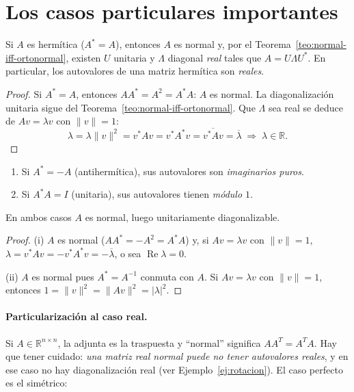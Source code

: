 \section{Los casos particulares importantes}\label{sec:casos-particulares}

\begin{corollary}\label{cor:hermitico}
Si \(A\) es hermítica (\(A^{*}=A\)), entonces \(A\) es normal y, por el
Teorema~\ref{teo:normal-iff-ortonormal}, existen $U$ unitaria y $\Lambda$ diagonal
\emph{real} tales que \(A=U\Lambda U^{*}\).
En particular, los autovalores de una matriz hermítica son \emph{reales}.
\end{corollary}

\begin{proof}
Si \(A^{*}=A\), entonces \(AA^{*}=A^{2}=A^{*}A\): \(A\) es normal.
La diagonalización unitaria sigue del Teorema~\ref{teo:normal-iff-ortonormal}.
Que $\Lambda$ sea real se deduce de $Av=\lambda v$ con $\|v\|=1$:
\[
\lambda= \lambda\|v\|^{2}=v^{*}Av=v^{*}A^{*}v=\overline{v^{*}Av}=\overline{\lambda}
\;\Longrightarrow\;\lambda\in\mathbb{R}.
\]
\end{proof}

\begin{corollary}   %
\begin{enumerate}[label=(\roman*)]
\item Si $A^{*}=-A$ (antihermítica), sus autovalores son \emph{imaginarios puros}.
\item Si $A^{*}A=I$ (unitaria), sus autovalores tienen \emph{módulo $1$}.
\end{enumerate}
En ambos casos $A$ es normal, luego unitariamente diagonalizable.
\end{corollary}

\begin{proof}
(i) $A$ es normal ($AA^{*}=-A^{2}=A^{*}A$) y, si $Av=\lambda v$ con $\|v\|=1$,
$\lambda=v^{*}Av=-v^{*}A^{*}v=-\overline{\lambda}$, o sea $\operatorname{Re}\lambda=0$.

\smallskip
(ii) $A$ es normal pues $A^{*}=A^{-1}$ conmuta con $A$. Si $Av=\lambda v$ con $\|v\|=1$,
entonces $1=\|v\|^2=\|Av\|^{2}=|\lambda|^{2}$.
\end{proof}

\paragraph{Particularización al caso real.}   %
Si $A\in\mathbb{R}^{n\times n}$, la adjunta es la traspuesta y ``normal'' significa
$AA^{T}=A^{T}A$. Hay que tener cuidado: \emph{una matriz real normal puede no tener
autovalores reales}, y en ese caso no hay diagonalización real (ver
Ejemplo~\ref{ej:rotacion}). El caso perfecto es el simétrico:

